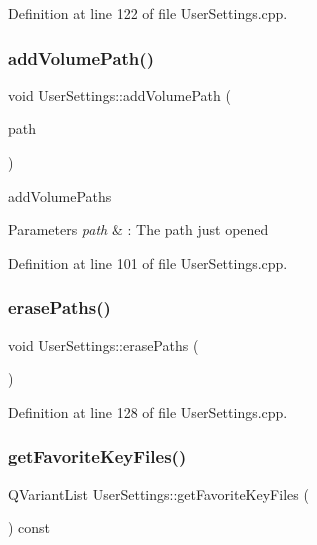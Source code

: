 Definition at line 122 of file User\+Settings.\+cpp.

\mbox{\label{class_user_settings_a69aa858c6028b46a80544712275388bb}} 
\subsubsection{\texorpdfstring{add\+Volume\+Path()}{addVolumePath()}}
{\footnotesize\ttfamily void User\+Settings\+::add\+Volume\+Path (\begin{DoxyParamCaption}\item[{const Q\+Url \&}]{path }\end{DoxyParamCaption})}



add\+Volume\+Paths 


\begin{DoxyParams}{Parameters}
{\em path} & \+: The path just opened \\
\hline
\end{DoxyParams}


Definition at line 101 of file User\+Settings.\+cpp.

\mbox{\label{class_user_settings_aefa49f195d95789aa6079bd072d0d438}} 
\subsubsection{\texorpdfstring{erase\+Paths()}{erasePaths()}}
{\footnotesize\ttfamily void User\+Settings\+::erase\+Paths (\begin{DoxyParamCaption}{ }\end{DoxyParamCaption})}



Definition at line 128 of file User\+Settings.\+cpp.

\mbox{\label{class_user_settings_a491eb502b4203b8660c10933edbe8320}} 
\subsubsection{\texorpdfstring{get\+Favorite\+Key\+Files()}{getFavoriteKeyFiles()}}
{\footnotesize\ttfamily Q\+Variant\+List User\+Settings\+::get\+Favorite\+Key\+Files (\begin{DoxyParamCaption}{ }\end{DoxyParamCaption}) const}

